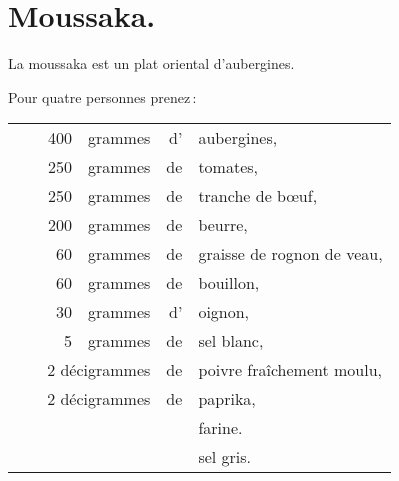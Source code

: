 \section*{\centering Moussaka.}
{}

La moussaka est un plat oriental d'aubergines.

Pour quatre personnes prenez :

\footnotesize
\begin{longtable}{rrrrrp{18em}}
  & \hspace{2em}  &  400 & grammes & d' & aubergines,                                                     \\
  & \hspace{2em}  &  250 & grammes & de & tomates,                                                        \\
  & \hspace{2em}  &  250 & grammes & de & tranche de bœuf,                                                \\
  & \hspace{2em}  &  200 & grammes & de & beurre,                                                         \\
  & \hspace{2em}  &   60 & grammes & de & graisse de rognon de veau,                                      \\
  & \hspace{2em}  &   60 & grammes & de & bouillon,                                                       \\
  & \hspace{2em}  &   30 & grammes & d' & oignon,                                                         \\
  & \hspace{2em}  &    5 & grammes & de & sel blanc,                                                      \\
  & \multicolumn{3}{r}{2 décigrammes} & de & poivre fraîchement moulu,                                    \\
  & \multicolumn{3}{r}{2 décigrammes} & de & paprika,                                                     \\
  & \hspace{2em}  &      &         &    & farine.                                                         \\
  & \hspace{2em}  &      &         &    & sel gris.                                                       \\
\end{longtable}
\normalsize

